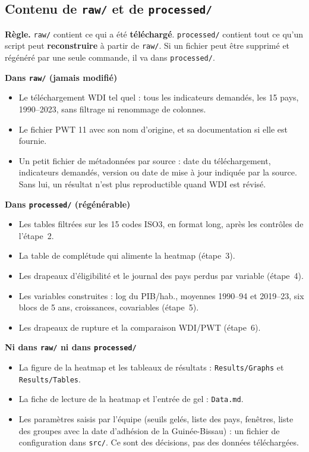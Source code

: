 \documentclass[21pt,a4paper]{article}
\begin{document}
	\subsection{Contenu de \texttt{raw/} et de \texttt{processed/}}
	
	\textbf{Règle.} \texttt{raw/} contient ce qui a été \textbf{téléchargé}. \texttt{processed/} contient tout ce qu'un script peut \textbf{reconstruire} à partir de \texttt{raw/}. Si un fichier peut être supprimé et régénéré par une seule commande, il va dans \texttt{processed/}.
	
	\textbf{Dans \texttt{raw/} (jamais modifié)}
	\begin{itemize}
		\item Le téléchargement WDI tel quel : tous les indicateurs demandés, les 15 pays, 1990--2023, sans filtrage ni renommage de colonnes.
		\item Le fichier PWT 11 avec son nom d'origine, et sa documentation si elle est fournie.
		\item Un petit fichier de métadonnées par source : date du téléchargement, indicateurs demandés, version ou date de mise à jour indiquée par la source. Sans lui, un résultat n'est plus reproductible quand WDI est révisé.
	\end{itemize}
	
	\textbf{Dans \texttt{processed/} (régénérable)}
	\begin{itemize}
		\item Les tables filtrées sur les 15 codes ISO3, en format long, après les contrôles de l'étape~2.
		\item La table de complétude qui alimente la heatmap (étape~3).
		\item Les drapeaux d'éligibilité et le journal des pays perdus par variable (étape~4).
		\item Les variables construites : log du PIB/hab., moyennes 1990--94 et 2019--23, six blocs de 5 ans, croissances, covariables (étape~5).
		\item Les drapeaux de rupture et la comparaison WDI/PWT (étape~6).
	\end{itemize}
	
	\textbf{Ni dans \texttt{raw/} ni dans \texttt{processed/}}
	\begin{itemize}
		\item La figure de la heatmap et les tableaux de résultats : \texttt{Results/Graphs} et \texttt{Results/Tables}.
		\item La fiche de lecture de la heatmap et l'entrée de gel : \texttt{Data.md}.
		\item Les paramètres saisis par l'équipe (seuils gelés, liste des pays, fenêtres, liste des groupes avec la date d'adhésion de la Guinée-Bissau) : un fichier de configuration dans \texttt{src/}. Ce sont des décisions, pas des données téléchargées.
	\end{itemize}
	
\end{document}
